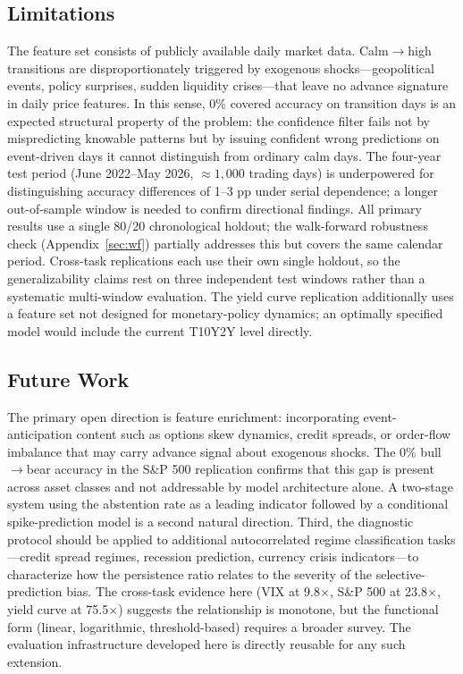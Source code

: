 \documentclass[11pt]{article}
\begin{document}
\subsection*{Limitations}

The feature set consists of publicly available daily market data. Calm$\to$high transitions are disproportionately triggered by exogenous shocks---geopolitical events, policy surprises, sudden liquidity crises---that leave no advance signature in daily price features. In this sense, 0\% covered accuracy on transition days is an expected structural property of the problem: the confidence filter fails not by mispredicting knowable patterns but by issuing confident wrong predictions on event-driven days it cannot distinguish from ordinary calm days. The four-year test period (June 2022--May 2026, ${\approx}1{,}000$ trading days) is underpowered for distinguishing accuracy differences of 1--3 pp under serial dependence; a longer out-of-sample window is needed to confirm directional findings. All primary results use a single 80/20 chronological holdout; the walk-forward robustness check (Appendix~\ref{sec:wf}) partially addresses this but covers the same calendar period. Cross-task replications each use their own single holdout, so the generalizability claims rest on three independent test windows rather than a systematic multi-window evaluation. The yield curve replication additionally uses a feature set not designed for monetary-policy dynamics; an optimally specified model would include the current T10Y2Y level directly.

\subsection*{Future Work}

The primary open direction is feature enrichment: incorporating event-anticipation content such as options skew dynamics, credit spreads, or order-flow imbalance that may carry advance signal about exogenous shocks. The 0\% bull$\to$bear accuracy in the S\&P 500 replication confirms that this gap is present across asset classes and not addressable by model architecture alone. A two-stage system using the abstention rate as a leading indicator followed by a conditional spike-prediction model is a second natural direction. Third, the diagnostic protocol should be applied to additional autocorrelated regime classification tasks---credit spread regimes, recession prediction, currency crisis indicators---to characterize how the persistence ratio relates to the severity of the selective-prediction bias. The cross-task evidence here (VIX at 9.8$\times$, S\&P 500 at 23.8$\times$, yield curve at 75.5$\times$) suggests the relationship is monotone, but the functional form (linear, logarithmic, threshold-based) requires a broader survey. The evaluation infrastructure developed here is directly reusable for any such extension.
\end{document}

